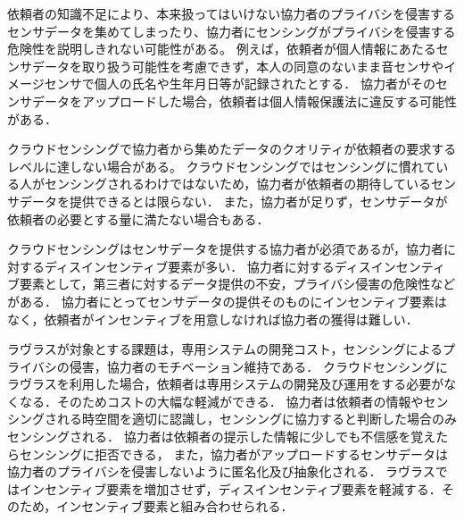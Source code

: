 依頼者の知識不足により、本来扱ってはいけない協力者のプライバシを侵害するセンサデータを集めてしまったり、協力者にセンシングがプライバシを侵害する危険性を説明しきれない可能性がある。
例えば，依頼者が個人情報にあたるセンサデータを取り扱う可能性を考慮できず，本人の同意のないまま音センサやイメージセンサで個人の氏名や生年月日等が記録されたとする．
協力者がそのセンサデータをアップロードした場合，依頼者は個人情報保護法に違反する可能性がある．

クラウドセンシングで協力者から集めたデータのクオリティが依頼者の要求するレベルに達しない場合がある。
クラウドセンシングではセンシングに慣れている人がセンシングされるわけではないため，協力者が依頼者の期待しているセンサデータを提供できるとは限らない．
また，協力者が足りず，センサデータが依頼者の必要とする量に満たない場合もある．

クラウドセンシングはセンサデータを提供する協力者が必須であるが，協力者に対するディスインセンティブ要素が多い．
協力者に対するディスインセンティブ要素として，第三者に対するデータ提供の不安，プライバシ侵害の危険性などがある．
協力者にとってセンサデータの提供そのものにインセンティブ要素はなく，依頼者がインセンティブを用意しなければ協力者の獲得は難しい．

ラヴラスが対象とする課題は，専用システムの開発コスト，センシングによるプライバシの侵害，協力者のモチベーション維持である．
クラウドセンシングにラヴラスを利用した場合，依頼者は専用システムの開発及び運用をする必要がなくなる．そのためコストの大幅な軽減ができる．
協力者は依頼者の情報やセンシングされる時空間を適切に認識し，センシングに協力すると判断した場合のみセンシングされる．
協力者は依頼者の提示した情報に少しでも不信感を覚えたらセンシングに拒否できる，
また，協力者がアップロードするセンサデータは協力者のプライバシを侵害しないように匿名化及び抽象化される．
ラヴラスではインセンティブ要素を増加させず，ディスインセンティブ要素を軽減する．そのため，インセンティブ要素と組み合わせられる．




